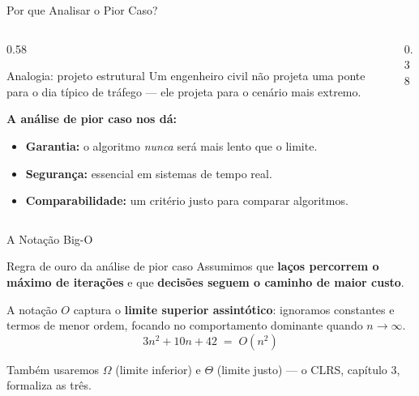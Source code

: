 \documentclass[aspectratio=169]{beamer}
\begin{document}
\begin{frame}[shrink]{Por que Analisar o Pior Caso?}
  \begin{columns}[T]
    \begin{column}{0.58\textwidth}
      \begin{block}{Analogia: projeto estrutural}
        Um engenheiro civil não projeta uma ponte para o dia típico de tráfego ---
        ele projeta para o cenário mais extremo.
      \end{block}

      \textbf{A análise de pior caso nos dá:}
      \begin{itemize}
        \item \textbf{Garantia:} o algoritmo \emph{nunca} será mais lento que o limite.
        \item \textbf{Segurança:} essencial em sistemas de tempo real.
        \item \textbf{Comparabilidade:} um critério justo para comparar algoritmos.
      \end{itemize}
    \end{column}
    \begin{column}{0.38\textwidth}
      \begin{center}
      \end{center}
    \end{column}
  \end{columns}
\end{frame}

\begin{frame}{A Notação Big-O}
  \begin{alertblock}{Regra de ouro da análise de pior caso}
    Assumimos que \textbf{laços percorrem o máximo de iterações} e que
    \textbf{decisões seguem o caminho de maior custo}.
  \end{alertblock}

  \vspace{0.4cm}
  A notação $O$ captura o \textbf{limite superior assintótico}: ignoramos constantes
  e termos de menor ordem, focando no comportamento dominante quando $n \to \infty$.
  \[
    3n^2 + 10n + 42 \;=\; O(n^2)
  \]

  \vspace{0.2cm}
  Também usaremos $\Omega$ (limite inferior) e $\Theta$ (limite justo) --- o CLRS,
  capítulo 3, formaliza as três.
\end{frame}
\end{document}
